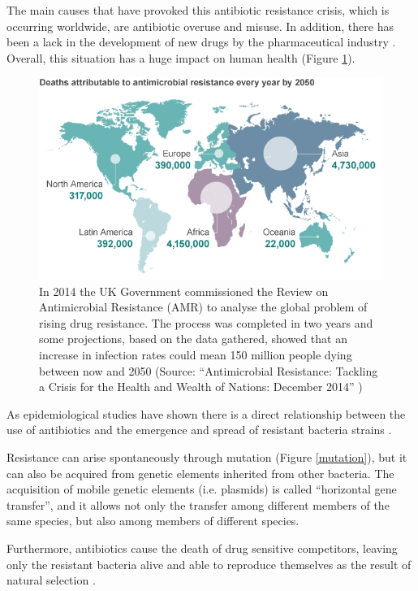 \documentclass[11pt]{report}
\begin{document}
The main causes that have provoked this antibiotic resistance crisis, which is occurring worldwide, are antibiotic overuse and misuse.
In addition, there has been a lack in the development of new drugs by the pharmaceutical industry \cite{nature2013}.
Overall, this situation has a huge impact on human health (Figure
\ref{spread2050}).

\begin{figure}[htp]
\centering
\includegraphics[scale=0.80]{img/spread2050.png}
\caption{In 2014 the UK Government commissioned the Review on Antimicrobial Resistance (AMR) to analyse the global problem of rising drug resistance.
The process was completed in two years and some projections, based on the data gathered, showed that an increase in infection rates could mean 150 million people dying between now and 2050 (Source: ``Antimicrobial Resistance: Tackling a Crisis for the Health and Wealth of Nations: December 2014'' \cite{review2014antimicrobial})}
\label{spread2050}
\end{figure}

As epidemiological studies have shown there is a direct relationship between the use of antibiotics and the emergence and spread of resistant bacteria strains \cite{huttner2013antimicrobial}.

Resistance can arise spontaneously through mutation (Figure \ref{mutation}), but it can also be acquired from genetic elements inherited from other bacteria.
The acquisition of mobile genetic elements (i.e. plasmids) is called ``horizontal gene transfer'', and it allows not only the transfer among different members of the same species, but also among members of different species.

Furthermore, antibiotics cause the death of drug sensitive competitors, leaving only the resistant bacteria alive and able to reproduce themselves as the result of natural selection \cite{doi:10.1093/emph/eou024}.
\end{document}
